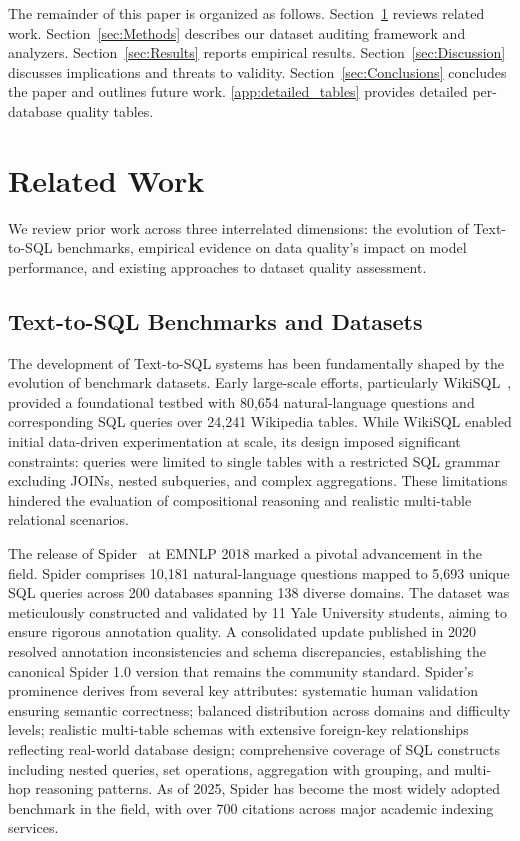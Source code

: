\documentclass[print]{einformatica}
\begin{document}
The remainder of this paper is organized as follows. Section~\ref{sec:RelatedWork} reviews related work. Section~\ref{sec:Methods} describes our dataset auditing framework and analyzers. Section~\ref{sec:Results} reports empirical results. Section~\ref{sec:Discussion} discusses implications and threats to validity. Section~\ref{sec:Conclusions} concludes the paper and outlines future work. \ref{app:detailed_tables} provides detailed per-database quality tables.

\section{Related Work}\label{sec:RelatedWork}

We review prior work across three interrelated dimensions: the evolution of Text-to-SQL benchmarks, empirical evidence on data quality's impact on model performance, and existing approaches to dataset quality assessment.

\subsection{Text-to-SQL Benchmarks and Datasets}

The development of Text-to-SQL systems has been fundamentally shaped by the evolution of benchmark datasets. Early large-scale efforts, particularly WikiSQL~\cite{zhong2017seq2sql}, provided a foundational testbed with 80,654 natural-language questions and corresponding SQL queries over 24,241 Wikipedia tables. While WikiSQL enabled initial data-driven experimentation at scale, its design imposed significant constraints: queries were limited to single tables with a restricted SQL grammar excluding JOINs, nested subqueries, and complex aggregations. These limitations hindered the evaluation of compositional reasoning and realistic multi-table relational scenarios.

The release of Spider~\cite{yu2018spider} at EMNLP 2018 marked a pivotal advancement in the field. Spider comprises 10,181 natural-language questions mapped to 5,693 unique SQL queries across 200 databases spanning 138 diverse domains. The dataset was meticulously constructed and validated by 11 Yale University students, aiming to ensure rigorous annotation quality. A consolidated update published in 2020 resolved annotation inconsistencies and schema discrepancies, establishing the canonical Spider 1.0 version that remains the community standard. Spider's prominence derives from several key attributes: systematic human validation ensuring semantic correctness; balanced distribution across domains and difficulty levels; realistic multi-table schemas with extensive foreign-key relationships reflecting real-world database design; comprehensive coverage of SQL constructs including nested queries, set operations, aggregation with grouping, and multi-hop reasoning patterns. As of 2025, Spider has become the most widely adopted benchmark in the field, with over 700 citations across major academic indexing services.
\end{document}
